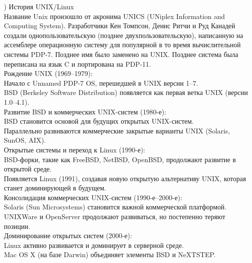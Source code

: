 ) История UNIX/Linux \\
Название Unix произошло от акронима UNICS (UNiplex Information and Computing System). Разработчики Кен Томпсон, Денис Ритчи и Руд Канадей создали однопользовательскую (позднее двухпользовательскую), написанную на ассемблере операционную систему для популярной в то время вычислительной системы PDP-7. Позднее имя было заменено на UNIX. Позднее система была переписана на язык C и портирована на PDP-11. \\
Рождение UNIX (1969–1979): \\
Начало с Unnamed PDP-7 OS, перешедшей в UNIX версии 1–7. \\
BSD (Berkeley Software Distribution) появляется как первая ветка UNIX (версии 1.0–4.1). \\
Развитие BSD и коммерческих UNIX-систем (1980-е): \\
BSD становится основой для будущих открытых UNIX-систем. \\
Параллельно развиваются коммерческие закрытые варианты UNIX (Solaris, SunOS, AIX). \\
Открытые системы и переход к Linux (1990-е): \\
BSD-форки, такие как FreeBSD, NetBSD, OpenBSD, продолжают развитие в открытой среде. \\
Появляется Linux (1991), создавая новую открытую альтернативу UNIX, которая станет доминирующей в будущем. \\
Консолидация коммерческих UNIX-систем (1990-е–2000-е): \\
Solaris (Sun Microsystems) становится важной коммерческой платформой. \\
UNIXWare и OpenServer продолжают развиваться, но постепенно теряют позиции. \\
Доминирование открытых систем (2000-е): \\
Linux активно развивается и доминирует в серверной среде. \\
Mac OS X (на базе Darwin) объединяет элементы BSD и NeXTSTEP. \\

